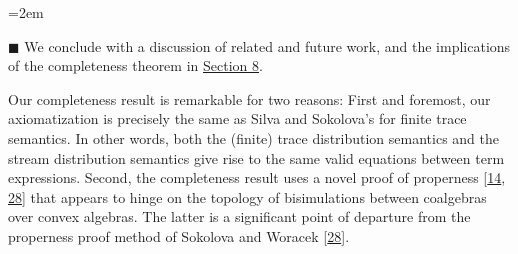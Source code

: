 \documentclass[11pt,a4paper]{amsart}
\begin{document}
\begin{list}{}{\leftmargin=2em}
\hypertarget{html:S1.I1.i7}{}
\item[]  %
\hypertarget{html:S1.I1.i7.m1}{}\({\blacksquare}\) %
\hypertarget{html:S1.I1.i7.p1}{} We conclude with a discussion of related and future work, and the implications of the completeness theorem in \hyperlink{html:S8}{Section 8}.
\par\medskip
  
 
\end{list}
\hypertarget{html:S1.p6}{} Our completeness result is remarkable for two reasons: First and foremost, our axiomatization is precisely the same as Silva and Sokolova’s for finite trace semantics. In other words, both the (finite) trace distribution semantics and the stream distribution semantics give rise to the same valid equations between term expressions. Second, the completeness result uses a novel proof of properness [\hyperlink{html:bib.bib14}{14}, \hyperlink{html:bib.bib28}{28}] that appears to hinge on the topology of bisimulations between coalgebras over convex algebras. The latter is a significant point of departure from the properness proof method of Sokolova and Woracek [\hyperlink{html:bib.bib28}{28}].
\par\medskip
  
\end{document}
